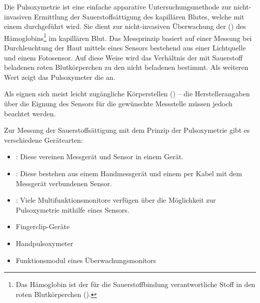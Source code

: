 {%
Die Pulsoxymetrie ist eine einfache apparative
Untersuchungsmethode zur nicht-invasiven Ermittlung der
Sauerstoffsättigung des kapillären Blutes, welche mit einem
 durchgeführt wird. Sie dient zur
nicht-invasiven Überwachung der 
() des Hämoglobins\footnote{Das Hämoglobin ist
der für die Sauerstoffbindung verantwortliche Stoff in den
roten Blutkörperchen ().} im
kapillären Blut. Das Messprinzip basiert auf einer Messung
 bei
Durchleuchtung der Haut mittels eines Sensors bestehend aus
einer Lichtquelle und einem Fotosensor. Auf diese Weise wird
das Verhältnis der mit Sauerstoff beladenen roten
Blutkörperchen zu den nicht beladenen bestimmt.
Als weiteren Wert zeigt das Pulsoxymeter die
 an.

Als  eignen sich meist leicht zugängliche
Körperstellen () -- die
Herstellerangaben über die Eignung des Sensors für die
gewünschte Messstelle müssen jedoch beachtet werden.
\cite{LoefflerBiochemie7,ArbeitstechnikenAZ1,Soehnke200607}

}{}{}{}{}
{%
Zur Messung der Sauerstoffsättigung mit dem Prinzip der
Pulsoxymetrie gibt es verschiedene Gerätearten:

\begin{itemize}
  \item {}: Diese vereinen Messgerät und
  Sensor in einem Gerät.
  \item {}: Diese bestehen aus einem
  Handmessgerät und einem per Kabel mit dem Messgerät verbundenen Sensor.
  \item {}:
  Viele Multifunktionsmonitore verfügen über die Möglichkeit zur Pulsoxymetrie
  mithilfe eines Sensors.
\end{itemize}

}{
\begin{itemize}
  \item Fingerclip-Geräte
  \item Handpulsoxymeter
  \item Funktionsmodul eines Überwachungsmonitors
\end{itemize}
}{}{}{}
